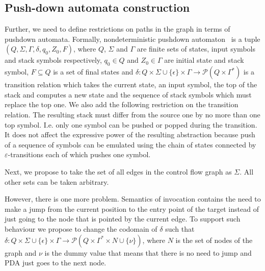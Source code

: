 \subsection{Push-down automata construction}

Further, we need to define restrictions on paths in the graph in terms of pushdown automata.
Formally, nondeterministic pushdown automaton~\cite{AutomataTheory} is a tuple $(Q, \Sigma, \Gamma, \delta, q_0, Z_0, F)$, where $Q$, $\Sigma$ and $\Gamma$ are finite sets of states, input symbols and stack symbols respectively, $q_0 \in Q$ and $Z_0 \in \Gamma$ are initial state and stack symbol, $F \subseteq Q$ is a set of final states and $\delta: Q \times \Sigma \cup \{\epsilon\} \times \Gamma \rightarrow \mathcal P (Q \times \Gamma^*)$ is a transition relation which takes the current state, an input symbol, the top of the stack and computes a new state and the sequence of stack symbols which must replace the top one.
We also add the following restriction on the transition relation.
The resulting stack must differ from the source one by no more than one top symbol. I.e. only one symbol can be pushed or popped during the transition.
It does not affect the expressive power of the resulting abstraction because push of a sequence of symbols can be emulated using the chain of states connected by $\varepsilon$-transitions each of which pushes one symbol.

Next, we propose to take the set of all edges in the control flow graph as $\Sigma$.
All other sets can be taken arbitrary.

However, there is one more problem.
Semantics of invocation contains the need to make a jump from the current position to the entry point of the target instead of just going to the node that is pointed by the current edge.
To support such behaviour we propose to change the codomain of $\delta$ such that $\delta: Q \times \Sigma \cup \{\epsilon\} \times \Gamma \rightarrow \mathcal P (Q \times \Gamma^* \times N \cup \{\nu\})$, where $N$ is the set of nodes of the graph and $\nu$ is the dummy value that means that there is no need to jump and PDA just goes to the next node.

